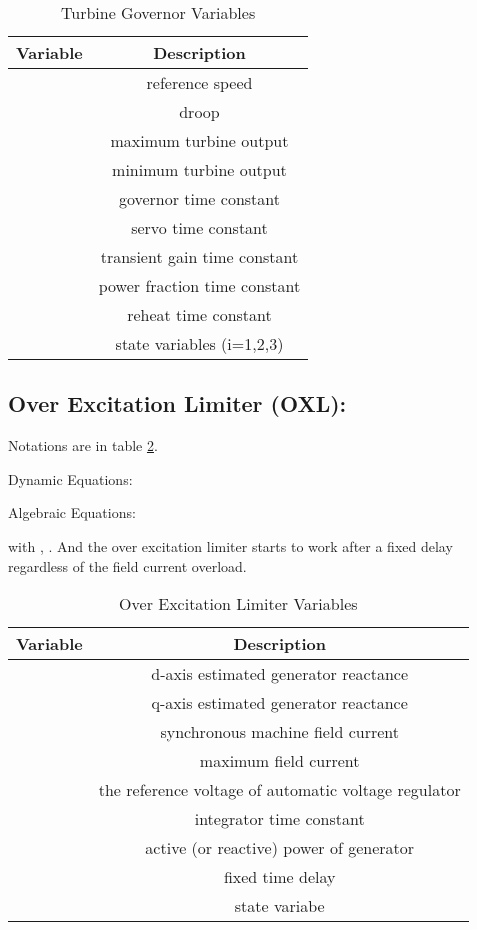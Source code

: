 \documentclass[journal]{IEEEtran}
\begin{document}
\begin{table}[h]
\centering
\caption{Turbine Governor Variables}\label{appedixtable4}
\begin{tabular}{|c|c|}
\hline
Variable&Description\\
\hline
&reference speed\\
\hline
&droop\\
\hline
&maximum turbine output\\
\hline
&minimum turbine output\\
\hline
&governor time constant\\
\hline
&servo time constant\\
\hline
&transient gain time constant\\
\hline
&power fraction time constant\\
\hline
&reheat time constant\\
\hline
&state variables (i=1,2,3)\\
\hline
\end{tabular}
\end{table}

\subsection{Over Excitation Limiter (OXL):}
Notations are in table \ref{appedixtable5}.

Dynamic Equations:


Algebraic Equations:

with , . And the over excitation limiter starts to work after a fixed delay  regardless of the field current overload.

\begin{table}
\centering
\caption{Over Excitation Limiter Variables}\label{appedixtable5}
\begin{tabular}{|c|c|}
\hline
Variable&Description\\
\hline
&d-axis estimated generator reactance\\
\hline
&q-axis estimated generator reactance\\
\hline
&synchronous machine field current\\
\hline
&maximum field current\\
\hline
&the reference voltage of automatic voltage regulator\\
\hline
&integrator time constant\\
\hline
&active (or reactive) power of generator\\
\hline
&fixed time delay\\
\hline
&state variabe\\
\hline
\end{tabular}
\end{table}
\end{document}
